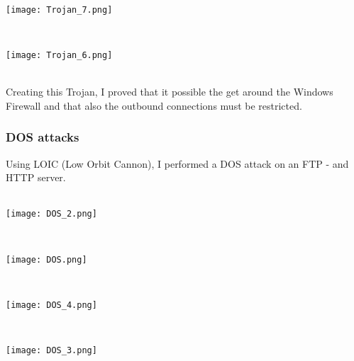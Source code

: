 $\;$ \\ \\
\noindent\begin{minipage}{\textwidth}
    \centering
    \texttt{[image: Trojan\_7.png]}
\end{minipage}
$\;$ \\ \\
\noindent\begin{minipage}{\textwidth}
    \centering
    \texttt{[image: Trojan\_6.png]}
\end{minipage}
$\;$ \\ \\
Creating this Trojan, I proved that it possible the get around the Windows Firewall and that also the outbound connections must be restricted.

\subsubsection{DOS attacks}

Using LOIC (Low Orbit Cannon), I performed a DOS attack on an FTP - and HTTP server. \\ \\
\noindent\begin{minipage}{\textwidth}
    \centering
    \texttt{[image: DOS\_2.png]}
\end{minipage}
$\;$ \\ \\
\noindent\begin{minipage}{\textwidth}
    \centering
    \texttt{[image: DOS.png]}
\end{minipage}
$\;$ \\ \\
\noindent\begin{minipage}{\textwidth}
    \centering
    \texttt{[image: DOS\_4.png]}
\end{minipage}
$\;$ \\ \\
\noindent\begin{minipage}{\textwidth}
    \centering
    \texttt{[image: DOS\_3.png]}
\end{minipage}

